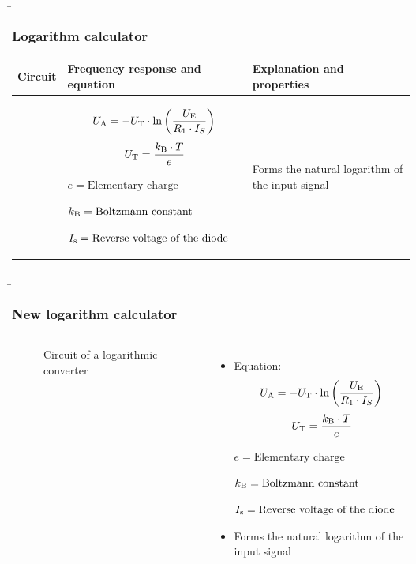 \begin{frame}
    \b{
    \frametitle{Logarithm calculator}
    \centering
    \begin{table}[ht]
    \label{tab:Logarithmierer}
    \begin{tabular}{|m{}|m{}|m{}|}
    \hline
    Circuit & Frequency response and equation & Explanation and properties\\ %
    \hline
    \vspace{0.5cm}
    \centering
    
    &
    \begin{center}
    \[
    U_{\textnormal{A}} =-U_{\textnormal{T}}\cdot \ln{\left(\frac{U_{\textnormal{E}}}{R_1\cdot I_S}\right)}
    \]
        \[
            U_{\textnormal{T}} = \frac{k_{\textnormal{B}} \cdot T}{e}
            \]
            
            \(e = \text{Elementary charge}\)
            
            \(k_{\textnormal{B}} = \text{Boltzmann constant}\)
            
            \(I_{\textnormal{s}} = \text{Reverse voltage of the diode}\)
    \end{center} 
    & 
    Forms the natural logarithm of the input signal \\
    \hline
    \end{tabular}
    \end{table}
    }
\end{frame}

\begin{frame}
    \renewcommand{\figurename}{Figure}
    \b{
    \frametitle{New logarithm calculator}
    \begin{columns}
        \centering
        \begin{figure}
    \centering
        
        \caption{Circuit of a logarithmic converter}

\end{figure}

        \raggedleft
        \begin{itemize}
            \item Equation:
           \[
    U_{\textnormal{A}} =-U_{\textnormal{T}}\cdot \ln{\left(\frac{U_{\textnormal{E}}}{R_1\cdot I_S}\right)}
    \]
        \[
            U_{\textnormal{T}} = \frac{k_{\textnormal{B}} \cdot T}{e}
            \]
            
            \(e = \text{Elementary charge}\)
            
            \(k_{\textnormal{B}} = \text{Boltzmann constant}\)
            
            \(I_{\textnormal{s}} = \text{Reverse voltage of the diode}\)
        \item Forms the natural logarithm of the input signal
    \end{itemize}
    \end{columns}
    }
\end{frame}

